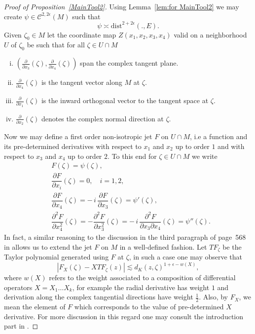 \documentclass[a4paper,12pt]{amsart}
\theoremstyle{definition}
\theoremstyle{remark}
\begin{document}
\begin{proof}[Proof of Proposition~\ref{MainTool2}]
    Using Lemma~{\ref{lem:for MainTool2}} we may create $\psi \in \mathcal{C}^{2,2\epsilon}(M)$ such that
    \begin{equation*}
        \psi \asymp \mathrm{dist}^{2+2\epsilon}(.,E).
    \end{equation*}
    Given $\zeta_0 \in M$ let the coordinate map $Z(x_1,x_2,x_3,x_4)$ valid on a neighborhood $U$ of $\zeta_0$ be such that for all $\zeta \in U \cap M$
    \begin{enumerate} [(i)]
        \item $\left( \frac{\partial}{\partial x_3} (\zeta) , \frac{\partial}{\partial x_4} (\zeta) \right)$ span the complex tangent plane. 
        \item $\frac{\partial}{\partial x_4}(\zeta)$ is the tangent vector along $M$ at $\zeta$.
        \item $\frac{\partial}{\partial x_1}(\zeta)$ is the inward orthogonal vector to the tangent space at $\zeta$.
        \item $\frac{\partial}{\partial x_2}(\zeta)$ denotes the complex normal direction at $\zeta$.
    \end{enumerate}
    Now we may define a first order non-isotropic jet $F$ on $U \cap M$, i.e a function and its pre-determined derivatives with respect to $x_1$ and $x_2$ up to order $1$ and with respect to $x_3$ and $x_4$ up to order $2$. To this end for $\zeta \in U \cap M$ we write
    \begin{equation} \label{eq:Jet values}
    \begin{aligned}
    &F(\zeta) = \psi(\zeta), \\[4pt]
    &\dfrac{\partial F}{\partial x_i}(\zeta) = 0, \quad i=1,2, \\[4pt]
    &\dfrac{\partial F}{\partial x_4}(\zeta)
    = -\, i\, \dfrac{\partial F}{\partial x_3}(\zeta)
    = \psi'(\zeta), \\[4pt]
    &\dfrac{\partial^2 F}{\partial x_4^2}(\zeta)
    = - \dfrac{\partial^2 F}{\partial x_3^2}(\zeta)
    = -\, i\, \dfrac{\partial^2 F}{\partial x_3 \partial x_4}(\zeta)
    = \psi''(\zeta).
    \end{aligned}
    \end{equation}
    In fact, a similar reasoning to the discussion in the third paragraph of page~{568} in \cite{Bruna1986} allows us to extend the jet $F$ on $M$ in a well-defined fashion. Let $TF_\zeta$ be the Taylor polynomial generated using $F$ at $\zeta$, in such a case one may observe that
    \begin{equation*}
        |F_X(\zeta)-XTF_{\zeta}(z)| \lesssim d_K(z,\zeta)^{1 + \epsilon - w(X)},
    \end{equation*}
    where $w(X)$ refers to the weight associated to a composition of differential operators $X = X_1 \ldots X_k$, for example the radial derivative has weight $1$ and derivation along the complex tangential directions have weight $\frac{1}{2}$. Also, by $F_X$, we mean the element of $F$ which corresponds to the value of pre-determined $X$ derivative. For more discussion in this regard one may consult the introduction part in \cite{Bruna1986}.
    

\end{proof}
\end{document}
